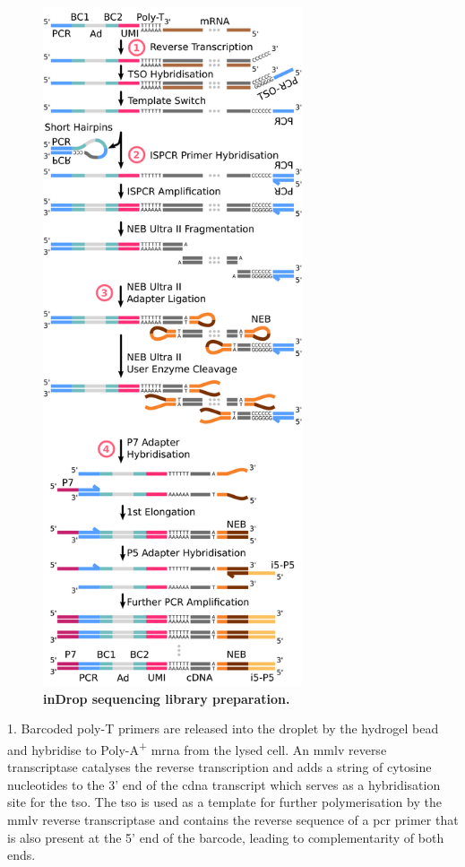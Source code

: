 \clearpage
\begin{figure}
\centering
\includegraphics[width=7.65cm]{./ims/indrop_detail.png}
\caption[inDrop sequencing library prepartion]{\textbf{inDrop sequencing library preparation.}}
\label{fig:indrop_detail}
\end{figure}

1. Barcoded poly-T primers are released into the droplet by the hydrogel bead and hybridise to Poly-A\textsuperscript{+} \acrshort{mrna} from the lysed cell. An \acrshort{mmlv} reverse transcriptase catalyses the reverse transcription and adds a string of cytosine nucleotides to the 3' end of the \acrshort{cdna} transcript which serves as a hybridisation site for the \acrfull{tso}. The \acrshort{tso} is used as a template for further polymerisation by the \acrshort{mmlv} reverse transcriptase and contains the reverse sequence of a \acrshort{pcr} primer that is also present at the 5' end of the barcode, leading to complementarity of both ends.\medskip

